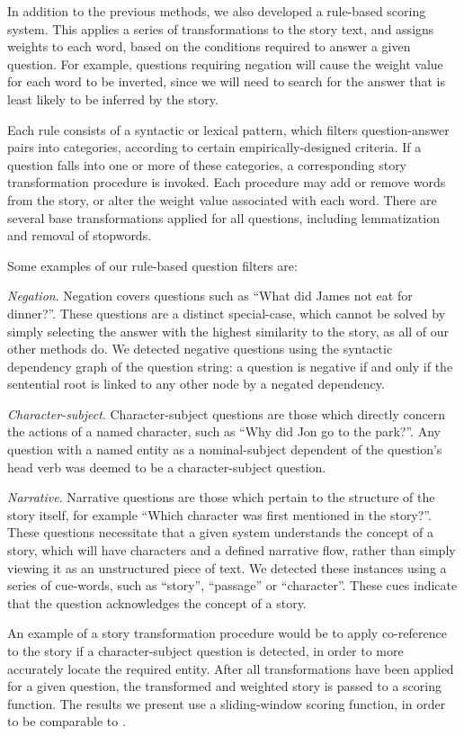 In addition to the previous methods, we also developed a rule-based scoring system. This applies a series of transformations to the story text, and assigns weights to each word, based on the conditions required to answer a given question. For example, questions requiring negation will cause the weight value for each word to be inverted, since we will need to search for the answer that is least likely to be inferred by the story.

Each rule consists of a syntactic or lexical pattern, which filters question-answer pairs into categories, according to certain empirically-designed criteria. If a question falls into one or more of these categories, a corresponding story transformation procedure is invoked. Each procedure may add or remove words from the story, or alter the weight value associated with each word. There are several base transformations applied for all questions, including lemmatization and removal of stopwords.

Some examples of our rule-based question filters are:

\textit{Negation}. Negation covers questions such as ``What did James not eat for dinner?''. These questions are a distinct special-case, which cannot be solved by simply selecting the answer with the highest similarity to the story, as all of our other methods do. We detected negative questions using the syntactic dependency graph of the question string: a question is negative if and only if the sentential root is linked to any other node by a negated dependency.

\textit{Character-subject}. Character-subject questions are those which directly concern the actions of a named character, such as ``Why did Jon go to the park?''. Any question with a named entity as a nominal-subject dependent of the question's head verb was deemed to be a character-subject question.

\textit{Narrative}. Narrative questions are those which pertain to the structure of the story itself, for example ``Which character was first mentioned in the story?''. These questions necessitate that a given system understands the concept of a story, which will have characters and a defined narrative flow, rather than simply viewing it as an unstructured piece of text. We detected these instances using a series of cue-words, such as ``story'', ``passage'' or ``character''. These cues indicate that the question acknowledges the concept of a story.

An example of a story transformation procedure would be to apply co-reference to the story if a character-subject question is detected, in order to more accurately locate the required entity. After all transformations have been applied for a given question, the transformed and weighted story is passed to a scoring function. The results we present use a sliding-window scoring function, in order to be comparable to .

